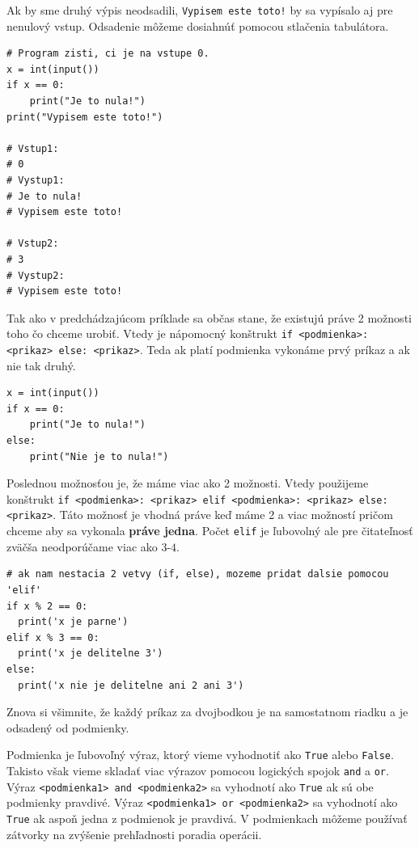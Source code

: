 Ak by sme druhý výpis neodsadili, \texttt{Vypisem este toto!} by sa vypísalo aj pre nenulový vstup. Odsadenie môžeme dosiahnúť pomocou stlačenia tabulátora.

\begin{lstlisting}
# Program zisti, ci je na vstupe 0.
x = int(input())
if x == 0:
    print("Je to nula!")
print("Vypisem este toto!")
    
# Vstup1:
# 0
# Vystup1:
# Je to nula!
# Vypisem este toto!

# Vstup2:
# 3
# Vystup2:
# Vypisem este toto!
\end{lstlisting}

Tak ako v predchádzajúcom príklade sa občas stane, že existujú práve 2 možnosti toho čo chceme urobiť. Vtedy je nápomocný konštrukt \texttt{if <podmienka>: <prikaz> else: <prikaz>}. Teda ak platí podmienka vykonáme prvý príkaz a ak nie tak druhý.

\begin{lstlisting}
x = int(input())
if x == 0:
    print("Je to nula!")
else:
    print("Nie je to nula!")
\end{lstlisting}

Poslednou možnosťou je, že máme viac ako 2 možnosti. Vtedy použijeme konštrukt \texttt{if <podmienka>: <prikaz> elif <podmienka>: <prikaz> else: <prikaz>}.
Táto možnosť je vhodná práve keď máme 2 a viac možností pričom chceme aby sa vykonala \textbf{práve jedna}. Počet \texttt{elif} je ľubovolný ale pre čitateľnosť zväčša neodporúčame viac ako $3$-$4$.

\begin{lstlisting}
# ak nam nestacia 2 vetvy (if, else), mozeme pridat dalsie pomocou 'elif'
if x % 2 == 0:
  print('x je parne')
elif x % 3 == 0:
  print('x je delitelne 3')
else:
  print('x nie je delitelne ani 2 ani 3')
\end{lstlisting}
Znova si všimnite, že každý príkaz za dvojbodkou je na samostatnom riadku a je odsadený od podmienky.

Podmienka je ľubovoľný výraz, ktorý vieme vyhodnotiť ako \texttt{True} alebo \texttt{False}.
Takisto však vieme skladať viac výrazov pomocou logických spojok \texttt{and} a \texttt{or}.
Výraz \texttt{<podmienka1> and <podmienka2>} sa vyhodnotí ako \texttt{True} ak sú obe podmienky pravdivé. 
Výraz \texttt{<podmienka1> or <podmienka2>} sa vyhodnotí ako \texttt{True} ak aspoň jedna z podmienok je pravdivá.
V podmienkach môžeme používať zátvorky na zvýšenie prehľadnosti poradia operácii.

